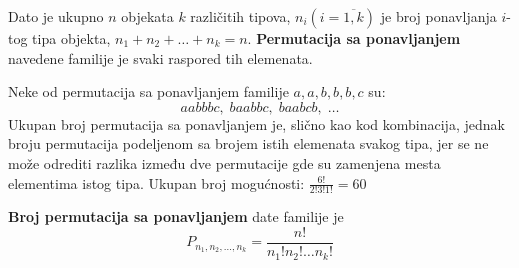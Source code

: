 \begin{definition}
	Dato je ukupno $n$ objekata $k$ različitih tipova, $n_i(i=\overline{1,k})$ je broj ponavljanja $i$-tog tipa objekta, $n_1+ n_2+ \ldots+ n_k = n$. \textbf{Permutacija sa ponavljanjem} navedene familije je svaki raspored tih elemenata.
\end{definition}
\begin{example}
	Neke od permutacija sa ponavljanjem familije $a,a,b,b,b,c$ su:
	$$aabbbc,\; baabbc,\; baabcb,\;\ldots$$
	Ukupan broj permutacija sa ponavljanjem je, slično kao kod kombinacija, jednak broju permutacija podeljenom sa brojem istih elemenata svakog tipa, jer se ne može odrediti razlika između dve permutacije gde su zamenjena mesta elementima istog tipa.
	Ukupan broj mogućnosti: $\frac{6!}{2!3!1!}=60$
\end{example}
\begin{theorem}
	\textbf{Broj permutacija sa ponavljanjem} date familije je $$P_{n_1, n_2, \ldots, n_k} = \frac{n!}{n_1!n_2!\ldots n_k!}$$
\end{theorem}

